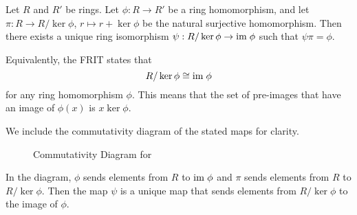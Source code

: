 \begin{theorem}\label{thrm-ring-isomorphism-1}
    Let $R$ and $R'$ be rings. Let $\phi: R \to R'$ be a ring homomorphism, and let $\pi: R \to R/\ker\phi$, $r\mapsto r + \ker\phi$ be the natural surjective homomorphism. Then there exists a unique ring isomorphism $\psi: R / \ker\phi \to \mathrm{im}\;\phi$ such that $\psi\pi = \phi$.
\end{theorem}
\begin{remark}
    Equivalently, the FRIT states that
    \[
        R / \ker\phi \cong \mathrm{im}\;\phi
    \]
    for any ring homomorphism $\phi$. This means that the set of pre-images that have an image of $\phi(x)$ is $x\ker\phi$.
\end{remark}

We include the commutativity diagram of the stated maps for clarity.
\begin{figure}[h]
    \centering
    \caption{Commutativity Diagram for }
\end{figure}

In the diagram, $\phi$ sends elements from $R$ to $\mathrm{im}\;\phi$ and $\pi$ sends elements from $R$ to $R/\ker\phi$. Then the map $\psi$ is a unique map that sends elements from $R/\ker\phi$ to the image of $\phi$.

